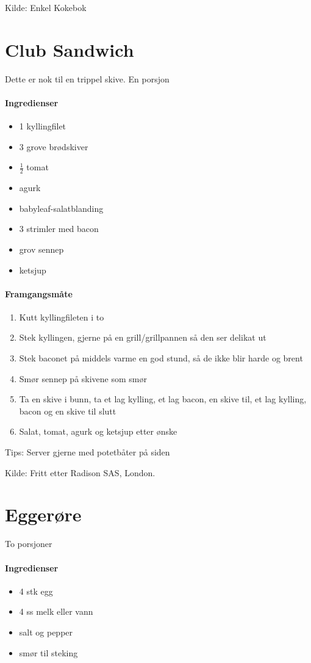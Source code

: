 \documentclass[12pt,a4paper]{book}
\begin{document}
Kilde: Enkel Kokebok
\clearpage{}
\clearpage{}\section{﻿Club Sandwich}
Dette er nok til en trippel skive. En porsjon

\paragraph{Ingredienser}
\begin{itemize}[noitemsep]
	\item 1 kyllingfilet
	\item 3 grove brødskiver
	\item $\frac{1}{2}$ tomat
	\item agurk
	\item babyleaf-salatblanding
	\item 3 strimler med bacon
	\item grov sennep
	\item ketsjup
\end{itemize}

\paragraph{Framgangsmåte}
\begin{enumerate}[noitemsep]
	\item Kutt kyllingfileten i to
	\item Stek kyllingen, gjerne på en grill/grillpannen så den ser delikat ut
	\item Stek baconet på middels varme en god stund, så de ikke blir harde og brent
	\item Smør sennep på skivene som smør
	\item Ta en skive i bunn, ta et lag kylling, et lag bacon, en skive til, et lag kylling, bacon og en skive til slutt
	\item Salat, tomat, agurk og ketsjup etter ønske
\end{enumerate}

Tips:
Server gjerne med potetbåter på siden

Kilde: Fritt etter Radison SAS, London.
\clearpage{}
\clearpage{}\section{﻿Eggerøre}
To porsjoner

\paragraph{Ingredienser}
\begin{itemize}[noitemsep]
	\item 4 stk egg
	\item 4 ss melk eller vann
	\item salt og pepper
	\item smør til steking
\end{itemize}
\end{document}
